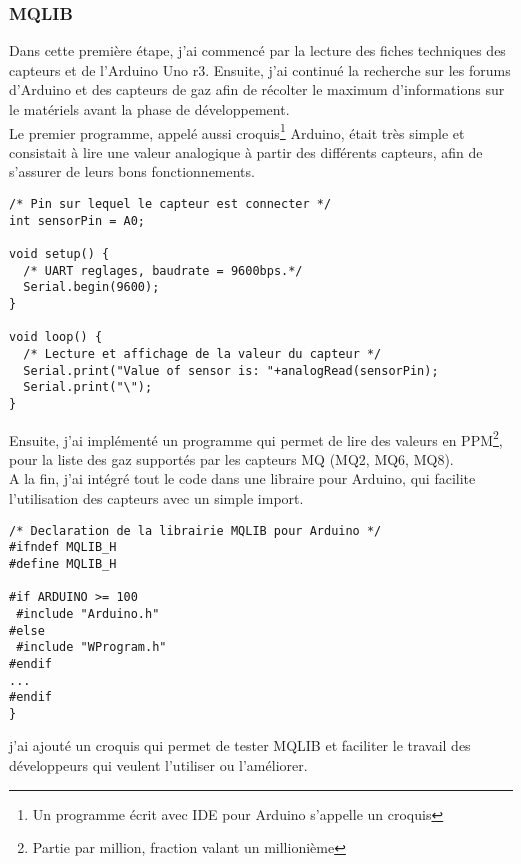 \newpage
\subsubsection{MQLIB}
Dans cette première étape, j'ai commencé par la lecture des  fiches techniques des capteurs et de l'Arduino Uno r3.
Ensuite, j'ai continué la recherche sur les forums d'Arduino et des capteurs de gaz afin de récolter le maximum d'informations sur le matériels avant la phase de développement.\\

Le premier programme, appelé aussi croquis\footnote{Un programme écrit avec IDE pour Arduino s'appelle un croquis} Arduino, était très simple et consistait à lire une valeur analogique à partir des différents capteurs, afin de s'assurer de leurs bons fonctionnements.\\
\begin{lstlisting}
/* Pin sur lequel le capteur est connecter */
int sensorPin = A0;  

void setup() {
  /* UART reglages, baudrate = 9600bps.*/
  Serial.begin(9600); 
}

void loop() {
  /* Lecture et affichage de la valeur du capteur */
  Serial.print("Value of sensor is: "+analogRead(sensorPin);
  Serial.print("\");
}
\end{lstlisting}
Ensuite, j'ai implémenté un programme qui permet de lire des valeurs en PPM\footnote{Partie par million, fraction valant un millionième}, pour la liste des gaz supportés par les capteurs MQ (MQ2, MQ6, MQ8).\\
A la fin, j'ai intégré tout le code dans une libraire pour Arduino, qui facilite l'utilisation des capteurs avec un simple import.
\begin{lstlisting}
/* Declaration de la librairie MQLIB pour Arduino */
#ifndef MQLIB_H
#define MQLIB_H

#if ARDUINO >= 100
 #include "Arduino.h"
#else
 #include "WProgram.h"
#endif
...
#endif
}
\end{lstlisting}
j'ai ajouté un croquis qui permet de tester MQLIB et faciliter le travail des développeurs qui veulent l'utiliser ou l’améliorer.  
